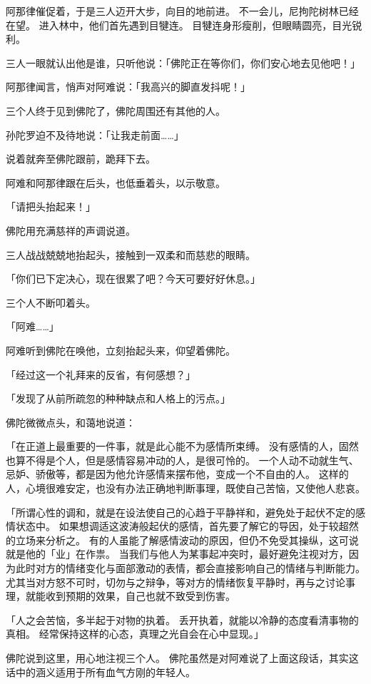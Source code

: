 \documentclass[twoside,openany]{book}
\begin{document}
阿那律催促着，于是三人迈开大步，向目的地前进。
不一会儿，尼拘陀树林已经在望。
进入林中，他们首先遇到目犍连。
目犍连身形瘦削，但眼睛圆亮，目光锐利。

三人一眼就认出他是谁，只听他说：「佛陀正在等你们，你们安心地去见他吧！」

阿那律闻言，悄声对阿难说：「我高兴的脚直发抖呢！」

三个人终于见到佛陀了，佛陀周围还有其他的人。

孙陀罗迫不及待地说：「让我走前面……」

说着就奔至佛陀跟前，跪拜下去。

阿难和阿那律跟在后头，也低垂着头，以示敬意。

「请把头抬起来！」

佛陀用充满慈祥的声调说道。

三人战战兢兢地抬起头，接触到一双柔和而慈悲的眼睛。

「你们已下定决心，现在很累了吧？今天可要好好休息。」

三个人不断叩着头。

「阿难……」

阿难听到佛陀在唤他，立刻抬起头来，仰望着佛陀。

「经过这一个礼拜来的反省，有何感想？」

「发现了从前所疏忽的种种缺点和人格上的污点。」

佛陀微微点头，和蔼地说道：

「在正道上最重要的一件事，就是此心能不为感情所束缚。
没有感情的人，固然也算不得是个人，但是感情容易冲动的人，是很可怜的。
一个人动不动就生气、忌妒、骄傲等，都是因为他允许感情来摆布他，变成一个不自由的人。
这样的人，心境很难安定，也没有办法正确地判断事理，既使自己苦恼，又使他人悲哀。

「所谓心性的调和，就是在设法使自己的心趋于平静祥和，避免处于起伏不定的感情状态中。
如果想调适这波涛般起伏的感情，首先要了解它的导因，处于较超然的立场来分析之。
有的人虽能了解感情波动的原因，但仍不免受其操纵，这可说就是他的「业」在作祟。
当我们与他人为某事起冲突时，最好避免注视对方，因为此时对方的情绪变化与面部激动的表情，都会直接影响自己的情绪与判断能力。
尤其当对方怒不可时，切勿与之辩争，等对方的情绪恢复平静时，再与之讨论事理，就能收到预期的效果，自己也就不致受到伤害。

「人之会苦恼，多半起于对物的执着。
丢开执着，就能以冷静的态度看清事物的真相。
经常保持这样的心态，真理之光自会在心中显现。」

佛陀说到这里，用心地注视三个人。
佛陀虽然是对阿难说了上面这段话，其实这话中的涵义适用于所有血气方刚的年轻人。
\end{document}
